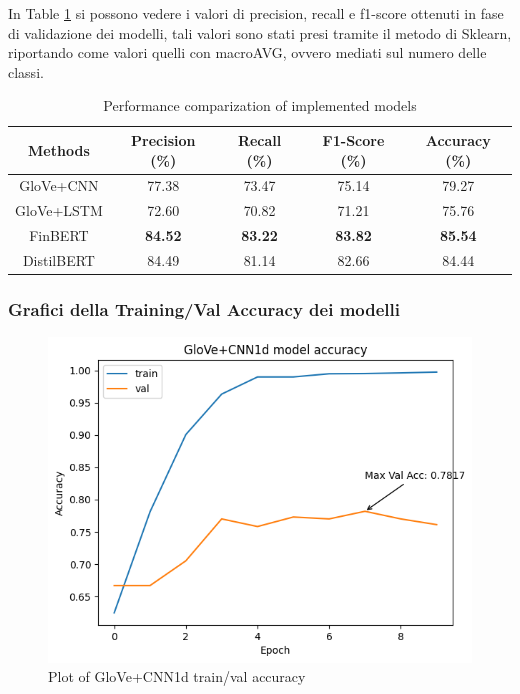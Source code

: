 In Table \ref{tab:performance} si possono vedere i valori di precision, recall e f1-score ottenuti in fase di validazione dei modelli, tali valori sono stati presi tramite il metodo  di Sklearn, riportando come valori quelli con macroAVG, ovvero mediati sul numero delle classi. 

\begin{table}[!ht]
  \centering
  \caption{Performance comparization of implemented models}
  \label{tab:performance}
  \begin{tabular}{c|c|c|c|c}
    Methods & Precision (\%) & Recall (\%) & F1-Score (\%) & Accuracy (\%) \\
    \midrule
    GloVe+CNN & 77.38 & 73.47 & 75.14 & 79.27 \\
    GloVe+LSTM & 72.60 & 70.82 & 71.21 & 75.76 \\
    FinBERT & \textbf{84.52} & \textbf{83.22} & \textbf{83.82} & \textbf{85.54} \\
    DistilBERT & 84.49 & 81.14 & 82.66 & 84.44 \\
    \bottomrule
  \end{tabular}
\end{table}
\newpage

\subsubsection{Grafici della Training/Val Accuracy dei modelli}
\begin{figure}[!ht]
    \centering
    \includegraphics[width=12cm]{./images/plot_cnn.png}
    \caption{Plot of GloVe+CNN1d train/val accuracy}
\end{figure}

